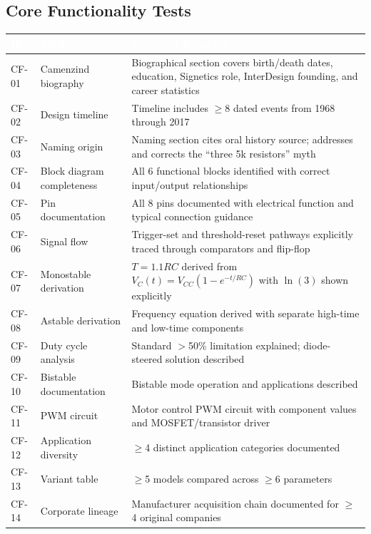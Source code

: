 \documentclass[11pt,letterpaper]{article}
\newcommand{\tableheader}[1]{\textbf{\sffamily\textcolor{white}{#1}}}
\begin{document}
\subsection{Core Functionality Tests}

\begin{center}
\begin{tabularx}{\textwidth}{C{1.2cm}L{3cm}X}
\toprule
{}
\tableheader{ID} & \tableheader{Verifies} & \tableheader{Expected Behavior} \\
\midrule
CF-01 & Camenzind biography & Biographical section covers birth/death dates, education, Signetics role, InterDesign founding, and career statistics \\
CF-02 & Design timeline & Timeline includes $\geq$8 dated events from 1968 through 2017 \\
CF-03 & Naming origin & Naming section cites oral history source; addresses and corrects the ``three 5k resistors'' myth \\
CF-04 & Block diagram completeness & All 6 functional blocks identified with correct input/output relationships \\
CF-05 & Pin documentation & All 8 pins documented with electrical function and typical connection guidance \\
CF-06 & Signal flow & Trigger-set and threshold-reset pathways explicitly traced through comparators and flip-flop \\
CF-07 & Monostable derivation & $T = 1.1RC$ derived from $V_C(t) = V_{CC}(1 - e^{-t/RC})$ with $\ln(3)$ shown explicitly \\
CF-08 & Astable derivation & Frequency equation derived with separate high-time and low-time components \\
CF-09 & Duty cycle analysis & Standard $>$50\% limitation explained; diode-steered solution described \\
CF-10 & Bistable documentation & Bistable mode operation and applications described \\
CF-11 & PWM circuit & Motor control PWM circuit with component values and MOSFET/transistor driver \\
CF-12 & Application diversity & $\geq$4 distinct application categories documented \\
CF-13 & Variant table & $\geq$5 models compared across $\geq$6 parameters \\
CF-14 & Corporate lineage & Manufacturer acquisition chain documented for $\geq$4 original companies \\
\bottomrule
\end{tabularx}
\end{center}
\end{document}
